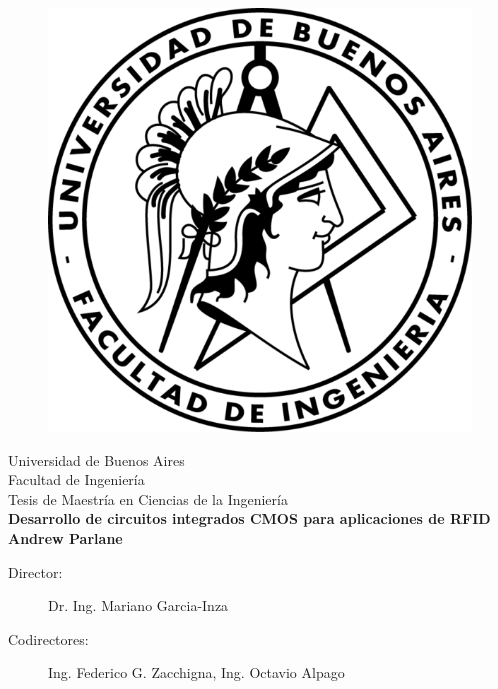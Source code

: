 \documentclass[a4paper, twoside, 11pt]{report}
\begin{document}
\begin{titlepage}

\capstartfalse
\begin{figure}
\centering
\includegraphics[scale=1.7]{./img/logo-facu.png}
\end{figure}
\capstarttrue

\begin{center}
    \Large{Universidad de Buenos Aires} \\
    \Large{Facultad de Ingeniería} \\
    \Large{Tesis de Maestría en Ciencias de la Ingeniería} \\
    \vspace{5mm}
    \huge{\bf Desarrollo de circuitos integrados CMOS para aplicaciones de RFID} \\
    \vspace{8mm}
    \huge{\bf Andrew Parlane}
\end{center}

\vspace*{\fill}

\begin{description}
    \item[\large{Director:}] \hspace{21pt} \large{Dr. Ing. Mariano Garcia-Inza}
    \item[\large{Codirectores:}] \large{Ing. Federico G. Zacchigna, Ing. Octavio Alpago}
\end{description}
\end{titlepage}
\end{document}
